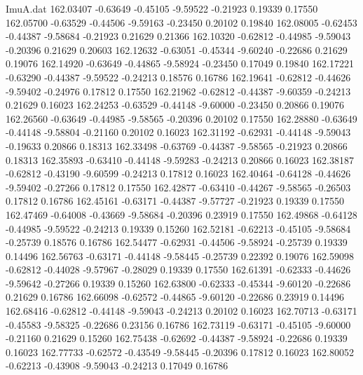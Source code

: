\begin{filecontents}{ImuA.dat}
 162.03407   -0.63649   -0.45105   -9.59522   -0.21923    0.19339    0.17550
 162.05700   -0.63529   -0.44506   -9.59163   -0.23450    0.20102    0.19840
 162.08005   -0.62453   -0.44387   -9.58684   -0.21923    0.21629    0.21366
 162.10320   -0.62812   -0.44985   -9.59043   -0.20396    0.21629    0.20603
 162.12632   -0.63051   -0.45344   -9.60240   -0.22686    0.21629    0.19076
 162.14920   -0.63649   -0.44865   -9.58924   -0.23450    0.17049    0.19840
 162.17221   -0.63290   -0.44387   -9.59522   -0.24213    0.18576    0.16786
 162.19641   -0.62812   -0.44626   -9.59402   -0.24976    0.17812    0.17550
 162.21962   -0.62812   -0.44387   -9.60359   -0.24213    0.21629    0.16023
 162.24253   -0.63529   -0.44148   -9.60000   -0.23450    0.20866    0.19076
 162.26560   -0.63649   -0.44985   -9.58565   -0.20396    0.20102    0.17550
 162.28880   -0.63649   -0.44148   -9.58804   -0.21160    0.20102    0.16023
 162.31192   -0.62931   -0.44148   -9.59043   -0.19633    0.20866    0.18313
 162.33498   -0.63769   -0.44387   -9.58565   -0.21923    0.20866    0.18313
 162.35893   -0.63410   -0.44148   -9.59283   -0.24213    0.20866    0.16023
 162.38187   -0.62812   -0.43190   -9.60599   -0.24213    0.17812    0.16023
 162.40464   -0.64128   -0.44626   -9.59402   -0.27266    0.17812    0.17550
 162.42877   -0.63410   -0.44267   -9.58565   -0.26503    0.17812    0.16786
 162.45161   -0.63171   -0.44387   -9.57727   -0.21923    0.19339    0.17550
 162.47469   -0.64008   -0.43669   -9.58684   -0.20396    0.23919    0.17550
 162.49868   -0.64128   -0.44985   -9.59522   -0.24213    0.19339    0.15260
 162.52181   -0.62213   -0.45105   -9.58684   -0.25739    0.18576    0.16786
 162.54477   -0.62931   -0.44506   -9.58924   -0.25739    0.19339    0.14496
 162.56763   -0.63171   -0.44148   -9.58445   -0.25739    0.22392    0.19076
 162.59098   -0.62812   -0.44028   -9.57967   -0.28029    0.19339    0.17550
 162.61391   -0.62333   -0.44626   -9.59642   -0.27266    0.19339    0.15260
 162.63800   -0.62333   -0.45344   -9.60120   -0.22686    0.21629    0.16786
 162.66098   -0.62572   -0.44865   -9.60120   -0.22686    0.23919    0.14496
 162.68416   -0.62812   -0.44148   -9.59043   -0.24213    0.20102    0.16023
 162.70713   -0.63171   -0.45583   -9.58325   -0.22686    0.23156    0.16786
 162.73119   -0.63171   -0.45105   -9.60000   -0.21160    0.21629    0.15260
 162.75438   -0.62692   -0.44387   -9.58924   -0.22686    0.19339    0.16023
 162.77733   -0.62572   -0.43549   -9.58445   -0.20396    0.17812    0.16023
 162.80052   -0.62213   -0.43908   -9.59043   -0.24213    0.17049    0.16786

\end{filecontents}
